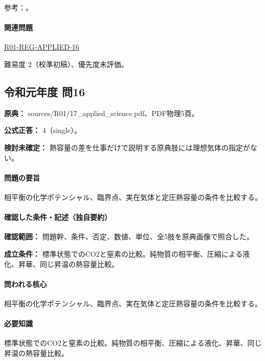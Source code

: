 \par 参考：\cite{iupac_greenbook2012,mit_thermo_firstlaw2008}。

\paragraph{関連問題} \hyperref[q:r01-reg-applied-16]{R01-REG-APPLIED-16}

\par 難易度 2（校準初稿）、優先度未評価。

\subsection{令和元年度 問16}
\label{q:r01-reg-applied-16}

\noindent\textbf{原典：} sources/R01/17\_applied\_science.pdf、PDF物理5頁。

\textbf{公式正答：} 4（single）。

\par\textbf{検討未確定：} 熱容量の差を仕事だけで説明する原典肢には理想気体の指定がない。

\paragraph{問題の要旨} 相平衡の化学ポテンシャル、臨界点、実在気体と定圧熱容量の条件を比較する。

\paragraph{確認した条件・記述（独自要約）}\mbox{}\par

\noindent\textbf{確認範囲：} 問題幹、条件、否定、数値、単位、全5肢を原典画像で照合した。\par

\noindent\textbf{成立条件：} 標準状態でのCO2と窒素の比較。純物質の相平衡、圧縮による液化、昇華、同じ昇温の熱容量比較。\par

\paragraph{問われる核心} 相平衡の化学ポテンシャル、臨界点、実在気体と定圧熱容量の条件を比較する。

\paragraph{必要知識} 標準状態でのCO2と窒素の比較。純物質の相平衡、圧縮による液化、昇華、同じ昇温の熱容量比較。

